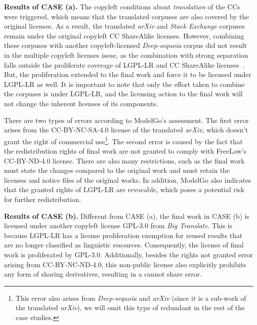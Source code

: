 \textbf{Results of CASE  (a).}
The copyleft conditions about \textit{translation} of the CCs were triggered, which means that the translated corpuses are also covered by the original licenses.
As a result, the translated \textit{arXiv} and \textit{Stack Exchange} corpuses remain under the original copyleft CC ShareAlike licenses. 
However, combining these corpuses with another copyleft-licensed \textit{Deep-sequoia} corpus did not result in the multiple copyleft licenses issue, as the combination with strong separation falls outside the proliferate coverage of LGPL-LR and CC ShareAlike licenses~\cite{creative2023artificial}.
But, the proliferation extended to the final work and force it to be licensed under LGPL-LR as well.
It is important to note that only the effort taken to combine the corpuses is under LGPL-LR, and the licensing action to the final work will not change the inherent licenses of its components.

There are two types of errors according to ModelGo's assessment.
The first error arises from the CC-BY-NC-SA-4.0 license of the translated \textit{arXiv}, which doesn't grant the right of commercial use\footnote{This error also arises from \textit{Deep-sequoia} and \textit{arXiv} (since it is a sub-work of the translated \textit{arXiv}), we will omit this type of redundant in the rest of the case studies.}. 
The second error is caused by the fact that the redistribution rights of final work are not granted to comply with FreeLaw's CC-BY-ND-4.0 license.
There are also many restrictions, such as the final work must state the changes compared to the original work and must retain the licenses and notice files of the original works.
In addition, ModelGo also indicates that the granted rights of LGPL-LR are revocable, which poses a potential risk for further redistribution.

\textbf{Results of CASE  (b).} 
Different from CASE  (a), the final work in CASE  (b) is licensed under another copyleft license GPL-3.0 from \textit{Big Translate}.
This is because LGPL-LR has a license proliferation exemption for reused results that are no longer classified as linguistic resources.
Consequently, the license of final work is proliferated by GPL-3.0.
Additionally, besides the rights not granted error arising from CC-BY-NC-ND-4.0, this non-public license also explicitly prohibits any form of sharing derivatives, resulting in a cannot share error.


